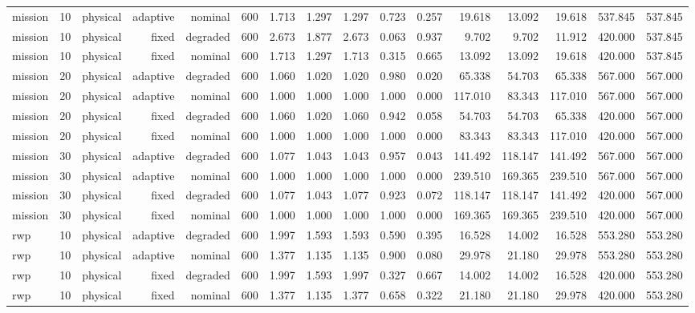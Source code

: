 \begin{tabular}{lrrrrrrrrrrrrrrr}
mission & 10 & physical & adaptive & nominal & 600 & 1.713 & 1.297 & 1.297 & 0.723 & 0.257 & 19.618 & 13.092 & 19.618 & 537.845 & 537.845 \\
mission & 10 & physical & fixed & degraded & 600 & 2.673 & 1.877 & 2.673 & 0.063 & 0.937 & 9.702 & 9.702 & 11.912 & 420.000 & 537.845 \\
mission & 10 & physical & fixed & nominal & 600 & 1.713 & 1.297 & 1.713 & 0.315 & 0.665 & 13.092 & 13.092 & 19.618 & 420.000 & 537.845 \\
mission & 20 & physical & adaptive & degraded & 600 & 1.060 & 1.020 & 1.020 & 0.980 & 0.020 & 65.338 & 54.703 & 65.338 & 567.000 & 567.000 \\
mission & 20 & physical & adaptive & nominal & 600 & 1.000 & 1.000 & 1.000 & 1.000 & 0.000 & 117.010 & 83.343 & 117.010 & 567.000 & 567.000 \\
mission & 20 & physical & fixed & degraded & 600 & 1.060 & 1.020 & 1.060 & 0.942 & 0.058 & 54.703 & 54.703 & 65.338 & 420.000 & 567.000 \\
mission & 20 & physical & fixed & nominal & 600 & 1.000 & 1.000 & 1.000 & 1.000 & 0.000 & 83.343 & 83.343 & 117.010 & 420.000 & 567.000 \\
mission & 30 & physical & adaptive & degraded & 600 & 1.077 & 1.043 & 1.043 & 0.957 & 0.043 & 141.492 & 118.147 & 141.492 & 567.000 & 567.000 \\
mission & 30 & physical & adaptive & nominal & 600 & 1.000 & 1.000 & 1.000 & 1.000 & 0.000 & 239.510 & 169.365 & 239.510 & 567.000 & 567.000 \\
mission & 30 & physical & fixed & degraded & 600 & 1.077 & 1.043 & 1.077 & 0.923 & 0.072 & 118.147 & 118.147 & 141.492 & 420.000 & 567.000 \\
mission & 30 & physical & fixed & nominal & 600 & 1.000 & 1.000 & 1.000 & 1.000 & 0.000 & 169.365 & 169.365 & 239.510 & 420.000 & 567.000 \\
rwp & 10 & physical & adaptive & degraded & 600 & 1.997 & 1.593 & 1.593 & 0.590 & 0.395 & 16.528 & 14.002 & 16.528 & 553.280 & 553.280 \\
rwp & 10 & physical & adaptive & nominal & 600 & 1.377 & 1.135 & 1.135 & 0.900 & 0.080 & 29.978 & 21.180 & 29.978 & 553.280 & 553.280 \\
rwp & 10 & physical & fixed & degraded & 600 & 1.997 & 1.593 & 1.997 & 0.327 & 0.667 & 14.002 & 14.002 & 16.528 & 420.000 & 553.280 \\
rwp & 10 & physical & fixed & nominal & 600 & 1.377 & 1.135 & 1.377 & 0.658 & 0.322 & 21.180 & 21.180 & 29.978 & 420.000 & 553.280 \\

\end{tabular}
